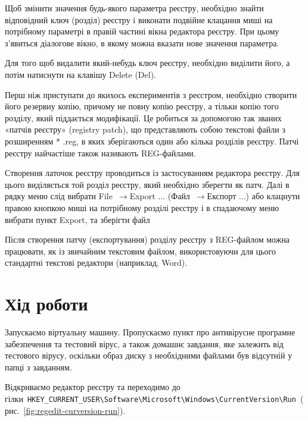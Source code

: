 \documentclass[
	a4paper,
	oneside,
	DIV = 12,
	fontsize = 13pt,
	headings = normal,
]{scrartcl}
\newcommand{\Mytextrightarrow}{$\rightarrow$\hspace{0.25em}}
\begin{document}
		Щоб змінити значення будь-якого параметра реєстру, необхідно знайти відповідний ключ (розділ) реєстру і виконати подвійне клацання миші на потрібному параметрі в правій частині вікна редактора реєстру. При цьому з'явиться діалогове вікно, в якому можна вказати нове значення параметра.

		Для того щоб видалити який-небудь ключ реєстру, необхідно виділити його, а потім натиснути на клавішу Delete (Del).

		Перш ніж приступати до якихось експериментів з реєстром, необхідно створити його резервну копію, причому не повну копію реєстру, а тільки копію того розділу, який піддається модифікації. Це робиться за допомогою так званих «патчів реєстру» (registry patch), що представляють собою текстові файли з розширенням * .reg, в яких зберігаються один або кілька розділів реєстру. Патчі реєстру найчастіше також називають REG-файлами. 

		Створення латочок реєстру проводиться із застосуванням редактора реєстру. Для цього виділяється той розділ реєстру, який необхідно зберегти як патч. Далі в рядку меню слід вибрати  File~\Mytextrightarrow Export ... (Файл~\Mytextrightarrow Експорт ...) або клацнути правою кнопкою миші на потрібному розділі реєстру і в спадаючому меню вибрати пункт Export, та зберігти файл

		Після створення патчу (експортування) розділу реєстру з REG-файлом можна працювати, як із звичайним текстовим файлом, використовуючи для цього стандартні текстові редактори (наприклад, Word).

	\section{Хід роботи}
		Запускаємо віртуальну машину. Пропускаємо пункт про антивірусне програмне забезпечення та тестовий вірус, а також домашнє завдання, яке залежить від тестового вірусу, оскільки образ диску з необхідними файлами був відсутній у папці з завданням.

		Відкриваємо редактор реєстру та переходимо до гілки~\texttt{\textenglish{HKEY\_CURRENT\_USER\textbackslash{}\-Software\textbackslash{}\-Microsoft\textbackslash{}\-Windows\textbackslash{}\-CurrentVersion\textbackslash{}\-Run}}~(рис.~\ref{fig:regedit-curversion-run}).
\end{document}
